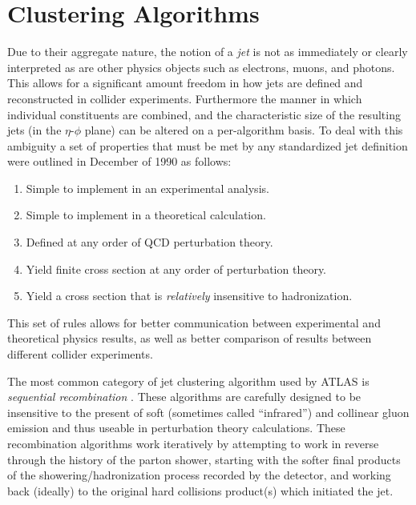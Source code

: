 \section{Clustering Algorithms}
Due to their aggregate nature, the notion of a \textit{jet} is not as immediately or clearly interpreted as are other physics objects such as electrons, muons, and photons.
This allows for a significant amount freedom in how jets are defined and reconstructed in collider experiments.
Furthermore the manner in which individual constituents are combined, and the characteristic size of the resulting jets (in the $\eta$-$\phi$ plane) can be altered on a per-algorithm basis.
To deal with this ambiguity a set of properties that must be met by any standardized jet definition were outlined in December of 1990 \cite{Huth:217490} as follows:
\begin{enumerate}
    \itemsep0em 
    \item Simple to implement in an experimental analysis.
    \item Simple to implement in a theoretical calculation.
    \item Defined at any order of QCD perturbation theory.
    \item Yield finite cross section at any order of perturbation theory.
    \item Yield a cross section that is \textit{relatively} insensitive to hadronization.
\end{enumerate}
This set of rules allows for better communication between experimental and theoretical physics results, as well as better comparison of results between different collider experiments.

The most common category of jet clustering algorithm used by ATLAS is \textit{sequential recombination} \cite{Catani:1993hr}.
These algorithms are carefully designed to be insensitive to the present of soft (sometimes called ``infrared'') and collinear gluon emission and thus useable in perturbation theory calculations.
These recombination algorithms work iteratively by attempting to work in reverse through the history of the parton shower, starting with the softer final products of the showering/hadronization process recorded by the detector, and working back (ideally) to the original hard collisions product(s) which initiated the jet.


